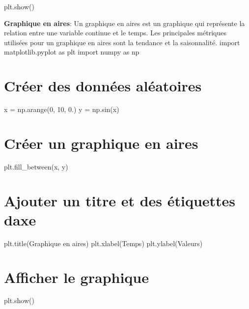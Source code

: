 plt.\+show()


\begin{DoxyEnumerate}
\item {\bfseries Graphique en aires}\+: Un graphique en aires est un graphique qui représente la relation entre une variable continue et le temps. Les principales métriques utilisées pour un graphique en aires sont la tendance et la saisonnalité. import matplotlib.\+pyplot as plt import numpy as np \section*{Créer des données aléatoires}
\end{DoxyEnumerate}

x = np.\+arange(0, 10, 0.) y = np.\+sin(x) \section*{Créer un graphique en aires}

plt.\+fill\+\_\+between(x, y) \section*{Ajouter un titre et des étiquettes d\textquotesingle{}axe}

plt.\+title(\textquotesingle{}Graphique en aires\textquotesingle{}) plt.\+xlabel(\textquotesingle{}Temps\textquotesingle{}) plt.\+ylabel(\textquotesingle{}Valeurs\textquotesingle{}) \section*{Afficher le graphique}

plt.\+show() 